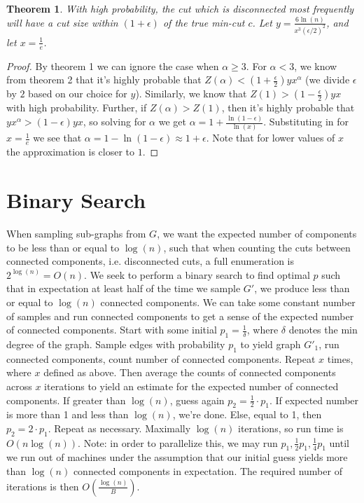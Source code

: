 \documentclass[12pt]{article}
\newtheorem{theorem}{Theorem}
\begin{document}
\begin{theorem}
With high probability, the cut which is disconnected most frequently will have a cut size within $(1+\epsilon)$ of the true min-cut $c$. Let $y = \frac{6 \ln(n)}{x^3 (\epsilon/2)^2}$, and let $x = \frac{1}{e}$.
\end{theorem}

\begin{proof}
By theorem 1 we can ignore the case when $\alpha \geq 3$. For $\alpha < 3$, we know from theorem 2 that it's highly probable that $Z(\alpha) < (1+\frac{\epsilon}{2})yx^\alpha$ (we divide $\epsilon$ by $2$ based on our choice for $y$).
Similarly, we know that $Z(1) > (1-\frac{\epsilon}{2}) yx$ with high probability. Further, if $Z(\alpha) > Z(1)$, then it's highly probable that $yx^\alpha > (1-\epsilon) yx$, so solving for $\alpha$ we get $\alpha = 1 + \frac{\ln(1-\epsilon)}{\ln(x)}$. Substituting in for $x = \frac{1}{e}$ we see that $\alpha = 1 - \ln(1 - \epsilon) \approx 1+\epsilon$. Note that for lower values of $x$ the approximation is closer to $1$.
\end{proof}

\section*{Binary Search}

When sampling sub-graphs from $G$, we want the expected number of components to be less than or equal to $\log(n)$, such that when counting the cuts between connected components, i.e. disconnected cuts, a full enumeration is $2^{\log(n)} = O(n)$. We seek to perform a binary search to find optimal $p$ such that in expectation at least half of the time we sample $G'$, we produce less than or equal to $\log(n)$ connected components. We can take some constant number of samples and run connected components to get a sense of the expected number of connected components. Start with some initial $p_1 = \frac{1}{\delta}$, where $\delta$ denotes the min degree of the graph. Sample edges with probability $p_1$ to yield graph $G'_1$, run connected components, count number of connected components. Repeat $x$ times, where $x$ defined as above. Then average the counts of connected components across $x$ iterations to yield an estimate for the expected number of connected components. If greater than $\log(n)$, guess again $p_2 = \frac{1}{2} \cdot p_1$. If expected number is more than 1 and less than $\log(n)$, we're done. Else, equal to 1, then $p_2 = 2 \cdot p_1$. Repeat as necessary. Maximally $\log(n)$ iterations, so run time is $O(n \log (n))$. Note: in order to parallelize this, we may run $p_1, \frac{1}{2}p_1, \frac{1}{4}p_1$ until we run out of machines under the assumption that our initial guess yields more than $\log(n)$ connected components in expectation. The required number of iterations is then $O(\frac{\log(n)}{B})$.
\end{document}
